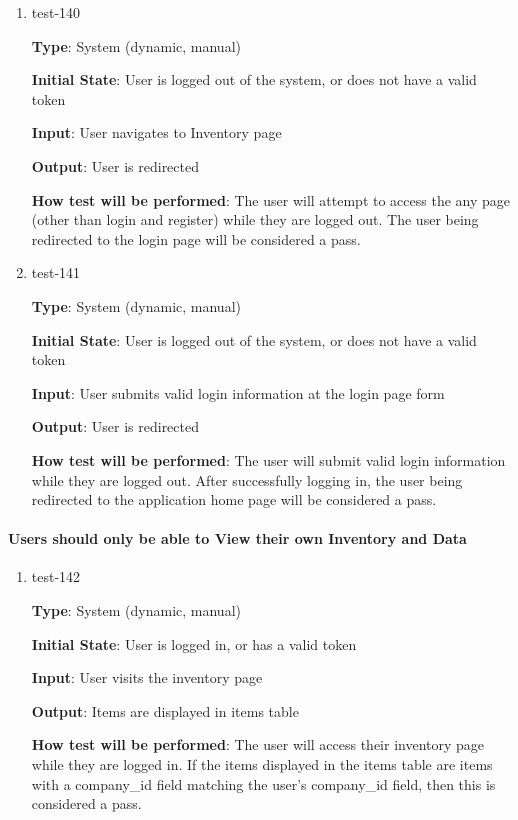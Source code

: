 \documentclass[12pt, titlepage]{article}
\begin{document}
\begin{enumerate}

\item{test-140\\}

\textbf{Type}: System (dynamic, manual)
					
\textbf{Initial State}: User is logged out of the system, or does not have a valid token
					
\textbf{Input}: User navigates to Inventory page
					
\textbf{Output}: User is redirected
					
\textbf{How test will be performed}: The user will attempt to access the any page (other than login and register) while they are logged out. The user being redirected to the login page will be considered a pass.
					
\item{test-141\\}

\textbf{Type}: System (dynamic, manual)
					
\textbf{Initial State}: User is logged out of the system, or does not have a valid token
					
\textbf{Input}: User submits valid login information at the login page form
					
\textbf{Output}: User is redirected
					
\textbf{How test will be performed}: The user will submit valid login information while they are logged out. After successfully logging in, the user being redirected to the application home page will be considered a pass.
\end{enumerate}

\paragraph{Users should only be able to View their own Inventory and Data}

\begin{enumerate}

\item{test-142\\}

\textbf{Type}: System (dynamic, manual)
					
\textbf{Initial State}: User is logged in, or has a valid token
					
\textbf{Input}: User visits the inventory page
					
\textbf{Output}: Items are displayed in items table
					
\textbf{How test will be performed}: The user will access their inventory page while they are logged in. If the items displayed in the items table are items with a company\_id field matching the user's company\_id field, then this is considered a pass.

\end{enumerate}
\end{document}
